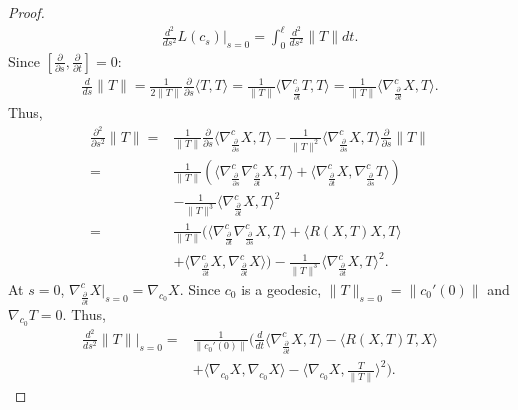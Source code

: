\begin{proof}
    \[
    \begin{aligned}
        \frac{d^2}{ds^2} L(c_s)|_{s=0} = \int_0^{\ell} \frac{d^2}{ds^2} \|T\| dt.
    \end{aligned}
    \]
    Since $[\frac{\partial}{\partial s}, \frac{\partial}{\partial t}]=0$:
    \[
    \begin{aligned}
        \frac{d}{ds} \|T\| = \frac{1}{2 \|T\|} \frac{\partial}{\partial s} \langle T, T \rangle = \frac{1}{\|T\|} \langle \nabla^c_{\frac{\partial}{\partial t}} T,T \rangle = \frac{1}{\|T\|} \langle \nabla_{\frac{\partial}{\partial t}}^c X, T \rangle.
    \end{aligned}
    \]
    Thus,
    \[
    \begin{aligned}
        \frac{\partial^2}{\partial s^2} \|T\| =& \frac{1}{\|T\|} \frac{\partial}{\partial s} \langle \nabla^c_{\frac{\partial}{\partial s}} X, T \rangle - \frac{1}{\|T\|^2} \langle \nabla^c_{\frac{\partial}{\partial s}} X, T \rangle \frac{\partial}{\partial s} \|T\| \\
        =&\frac{1}{\|T\|} \left( \langle \nabla^c_{\frac{\partial}{\partial s}} \nabla^c_{\frac{\partial}{\partial t}} X, T \rangle + \langle \nabla^c_{\frac{\partial}{\partial t}} X, \nabla^c_{\frac{\partial}{\partial s}} T \rangle \right) \\
        &-\frac{1}{\|T\|^3} \langle \nabla^c_{\frac{\partial}{\partial t}} X,T \rangle^2 \\
        =& \frac{1}{\|T\|} ( \langle \nabla^c_{\frac{\partial}{\partial t}} \nabla^c_{\frac{\partial}{\partial s}} X, T \rangle + \langle R(X,T)X, T \rangle \\
        &+ \langle \nabla^c_{\frac{\partial}{\partial t}} X, \nabla^c_{\frac{\partial}{\partial t}} X \rangle )- \frac{1}{\|T\|^3} \langle \nabla^c_{\frac{\partial}{\partial t}} X, T \rangle^2.
    \end{aligned}
    \]
    At $s=0$, $\nabla^c_{\frac{\partial}{\partial t}} X |_{s=0}= \nabla_{c_0} X$. Since $c_0$ is a geodesic,
    $\|T\|_{s=0} = \|c_0'(0)\|$ and $\nabla_{c_0}T=0$. Thus,
    \[
    \begin{aligned}
        \frac{d^2}{ds^2} \|T\| |_{s=0} =& \frac{1}{\|c_0'(0)\|} \Bigg(\frac{d}{dt} \langle \nabla^c_{\frac{\partial}{\partial t}} X, T \rangle - \langle R(X,T)T,X \rangle \\
        &+ \langle \nabla_{c_0} X, \nabla_{c_0}X \rangle - \langle \nabla_{c_0}X, \frac{T}{\|T\|} \rangle^2\Bigg).
    \end{aligned}
\]
\end{proof}
